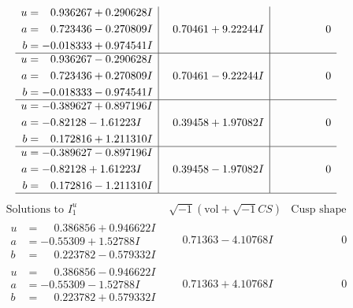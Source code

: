 \documentclass[1p]{elsarticle_modified}
\theoremstyle{definition}
\newcommand{\I}{\sqrt{-1}}
\begin{document}
$$\begin{array}{c|c|c}
\begin{aligned}
u &= \phantom{-}0.936267 + 0.290628 I \\
a &= \phantom{-}0.723436 - 0.270809 I \\
b &= -0.018333 + 0.974541 I\end{aligned}
 & \phantom{-}0.70461 + 9.22244 I & \phantom{-0.000000 } 0 \\ \hline\begin{aligned}
u &= \phantom{-}0.936267 - 0.290628 I \\
a &= \phantom{-}0.723436 + 0.270809 I \\
b &= -0.018333 - 0.974541 I\end{aligned}
 & \phantom{-}0.70461 - 9.22244 I & \phantom{-0.000000 } 0 \\ \hline\begin{aligned}
u &= -0.389627 + 0.897196 I \\
a &= -0.82128 - 1.61223 I \\
b &= \phantom{-}0.172816 + 1.211310 I\end{aligned}
 & \phantom{-}0.39458 + 1.97082 I & \phantom{-0.000000 } 0 \\ \hline\begin{aligned}
u &= -0.389627 - 0.897196 I \\
a &= -0.82128 + 1.61223 I \\
b &= \phantom{-}0.172816 - 1.211310 I\end{aligned}
 & \phantom{-}0.39458 - 1.97082 I & \phantom{-0.000000 } 0\\
 \hline 
 \end{array}$$\newpage$$\begin{array}{c|c|c}  
\text{Solutions to }I^u_{1}& \I (\text{vol} + \sqrt{-1}CS) & \text{Cusp shape}\\
 \hline 
\begin{aligned}
u &= \phantom{-}0.386856 + 0.946622 I \\
a &= -0.55309 + 1.52788 I \\
b &= \phantom{-}0.223782 - 0.579332 I\end{aligned}
 & \phantom{-}0.71363 - 4.10768 I & \phantom{-0.000000 } 0 \\ \hline\begin{aligned}
u &= \phantom{-}0.386856 - 0.946622 I \\
a &= -0.55309 - 1.52788 I \\
b &= \phantom{-}0.223782 + 0.579332 I\end{aligned}
 & \phantom{-}0.71363 + 4.10768 I & \phantom{-0.000000 } 0 \\ \hline\begin{aligned}

\end{aligned}
\end{array}$$
\end{document}
